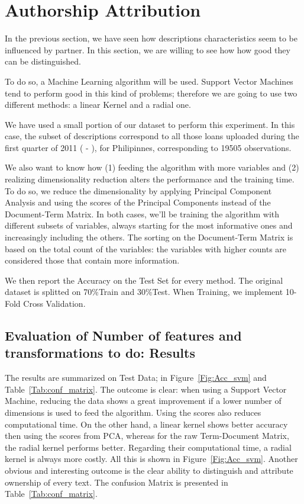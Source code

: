\section{Authorship Attribution}
In the previous section, we have seen how descriptions characteristics seem to be influenced by partner. In this section, we are willing to see how how good they can be distinguished. \par
To do so, a Machine Learning algorithm will be used. Support Vector Machines tend to perform good in this kind of problems; therefore we are going to use two different methods: a linear Kernel and a radial one. \par
We have used a small portion of our dataset to perform this experiment. In this case, the subset of descriptions correspond to all those loans uploaded during the first quarter of 2011 ( - ), for Philipinnes, corresponding to 19505 observations. \par
We also want to know how (1) feeding the algorithm with more variables and (2) realizing dimensionality reduction alters the performance and the training time. To do so, we reduce the dimensionality by applying Principal Component Analysis and using the scores of the Principal Components instead of the Document-Term Matrix. In both cases, we'll be training the algorithm with different subsets of variables, always starting for the most informative ones and increasingly including the others. The sorting on the Document-Term Matrix is based on the total count of the variables: the variables with higher counts are considered those that contain more information. \par
We then report the Accuracy on the Test Set for every method. The original dataset is splitted on 70\%Train and 30\%Test. When Training, we implement 10-Fold Cross Validation.
%
\subsection{Evaluation of Number of features and transformations to do: Results}
The results are summarized on Test Data; in Figure~\ref{Fig:Acc_svm} and Table~\ref{Tab:conf_matrix}.
The outcome is clear: when using a Support Vector Machine, reducing the data shows a great improvement if a lower number of dimensions is used to feed the algorithm. Using the scores also reduces computational time.
On the other hand, a linear kernel shows better accuracy then using the scores from PCA, whereas for the raw Term-Document Matrix, the radial kernel performs better. Regarding their computational time, a radial kernel is always more costly. All this is shown in Figure~\ref{Fig:Acc_svm}.
Another obvious and interesting outcome is the clear ability to distinguish and attribute ownership of every text. The confusion Matrix is presented in Table~\ref{Tab:conf_matrix}.


